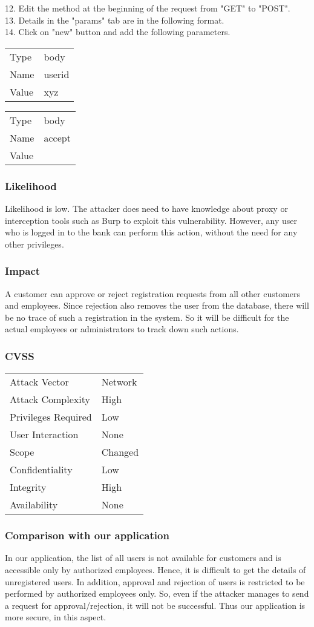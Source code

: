 12. Edit the method at the beginning of the request from "GET" to "POST". \\
13. Details in the "params" tab are in the following format. \\
14. Click on "new" button and add the following parameters. \\
\begin{tabular}{l | l}
Type		& body \\
Name		& userid \\
Value 		& xyz
\end{tabular}
\begin{tabular}{l | l}
Type		& body \\
Name		& accept \\
Value 		& 
\end{tabular}

\subsubsection{Likelihood}
Likelihood is low.
The attacker does need to have knowledge about proxy or interception tools such as Burp to exploit this vulnerability. However, any user who is logged in to the bank can perform this action, without the need for any other privileges.

\subsubsection{Impact}
A customer can approve or reject registration requests from all other customers and employees. Since rejection also removes the user from the database, there will be no trace of such a registration in the system. So it will be difficult for the actual employees or administrators to track down such actions.

\subsubsection{CVSS}
\begin{tabular}{l | l}
Attack Vector		& Network \\
Attack Complexity	& High \\
Privileges Required & Low \\
User Interaction	& None \\
Scope				& Changed \\
Confidentiality		& Low \\
Integrity			& High \\
Availability		& None
\end{tabular}

\subsubsection{Comparison with our application}
In our application, the list of all users is not available for customers and is accessible only by authorized employees. Hence, it is difficult to get the details of unregistered users. In addition, approval and rejection of users is restricted to be performed by authorized employees only. So, even if the attacker manages to send a request for approval/rejection, it will not be successful. Thus our application is more secure, in this aspect.
\clearpage